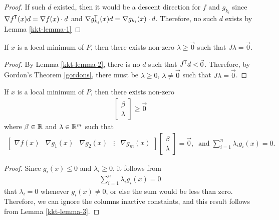 \begin{proof}
    If such $d$ existed, then it would be a descent direction for $f$ and $g_{k_i}$ since $\nabla f^{\mkern-1.5mu\mathsf{T}}(x)d = \nabla f(x) \cdot d$ and $\nabla g_{k_i}^{\mkern-1.5mu\mathsf{T}}(x)d = \nabla g_{k_i}(x) \cdot d$. Therefore, no such $d$ exists by Lemma \ref{kkt-lemma-1}
\end{proof}

\begin{lemma}\label{kkt-lemma-3}
    If $x$ is a local minimum of $P$, then there exists non-zero $\lambda \geq \vec{0}$ such that $J\lambda = \vec{0}$.
\end{lemma}

\begin{proof}
    By Lemma \ref{kkt-lemma-2}, there is no $d$ such that $J^{\mkern-1.5mu\mathsf{T}}d < \vec{0}$. Therefore, by Gordon's Theorem \ref{gordons}, there must be $\lambda \geq 0$, $\lambda \neq \vec{0}$ such that $J\lambda = \vec{0}$.
\end{proof}

\begin{lemma}\label{kkt-lemma-4}
    If $x$ is a local minimum of $P$, then there exists non-zero
    \begin{align*}
        \begin{bmatrix}
            \beta \\ \lambda
        \end{bmatrix} \geq \vec{0}
    \end{align*}
    where $\beta \in \mathbb{R}$ and $\lambda \in \mathbb{R}^m$ such that
    \begin{align*}
        \left[\begin{array}{c|c|c|c|c}
            \nabla f(x) & \nabla g_1(x) & \nabla g_2(x) & \vdots & \nabla g_m(x)
        \end{array}\right]\begin{bmatrix}
            \beta \\ \lambda
        \end{bmatrix} = \vec{0},\;\;\textrm{and}\;\sum_{i=1}^{n}\lambda_ig_i(x) = 0.
    \end{align*}
\end{lemma}

\begin{proof}
    Since $g_i(x) \leq 0$ and $\lambda_i \geq 0$, it follows from
    \begin{align*}
        \sum_{i=1}^{n}\lambda_ig_i(x) = 0
    \end{align*}
    that $\lambda_i = 0$ whenever $g_i(x) \neq 0$, or else the sum would be less than zero. Therefore, we can ignore the columns inactive constaints, and this result follows from Lemma \ref{kkt-lemma-3}.
\end{proof}

